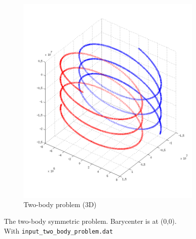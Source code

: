 \documentclass{article}
\begin{document}
\begin{figure}[H]
\begin{subfigure}[b]{0.3\textwidth}
                \includegraphics[width=\textwidth]{img/binar_3d}
                \caption{Two-body problem (3D)}
                \label{fig:bin3D}
        \end{subfigure}
        \caption{The two-body symmetric problem. Barycenter is at (0,0).\\With \texttt{input\_two\_body\_problem.dat}}\label{fig:twobody}
\end{figure}
\end{document}
